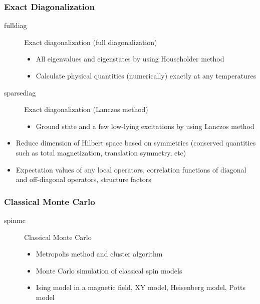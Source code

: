 \begin{frame}
  \frametitle{Exact Diagonalization}
  \begin{description}
  \item[fulldiag] Exact diagonalization (full diagonalization)
    \begin{itemize}
    \item All eigenvalues and eigenstates by using Householder method
    \item Calculate physical quantities (numerically) exactly at any temperatures
    \end{itemize}
  \item[sparsediag] Exact diagonalization (Lanczos method)
    \begin{itemize}
    \item Ground state and a few low-lying excitations by using Lanczos method
    \end{itemize}
  \end{description}
  \begin{itemize}
  \item Reduce dimension of Hilbert space based on symmetries (conserved quantities such as total magnetization, translation symmetry, etc)
  \item Expectation values of any local operators, correlation functions of diagonal and off-diagonal operators, structure factors
  \end{itemize}
\end{frame}

\begin{frame}
  \frametitle{Classical Monte Carlo}
  \begin{description}
  \item[spinmc] Classical Monte Carlo
    \begin{itemize}
      \item Metropolis method and cluster algorithm
      \item Monte Carlo simulation of classical spin models
      \item Ising model in a magnetic field, XY model, Heisenberg model, Potts model
    \end{itemize}
  \end{description}
\end{frame}

